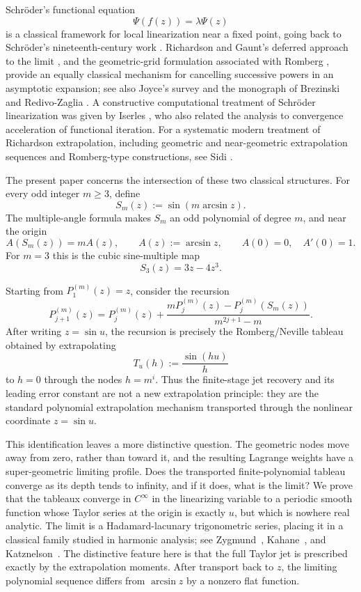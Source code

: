 \documentclass[11pt]{article}
\theoremstyle{remark}
\begin{document}
Schr\"oder's functional equation
\[
\Psi(f(z))=\lambda\Psi(z)
\]
is a classical framework for local linearization near a fixed point, going
back to Schr\"oder's nineteenth-century work \cite{Schroeder1870}.  Richardson
and Gaunt's deferred approach to the limit \cite{RichardsonGaunt1927}, and the
geometric-grid formulation associated with Romberg \cite{Romberg1955}, provide
an equally classical mechanism for cancelling successive powers in an
asymptotic expansion; see also Joyce's survey \cite{Joyce1971} and the monograph
of Brezinski and Redivo-Zaglia \cite{BrezinskiRedivo1991}.  A constructive
computational treatment of Schr\"oder linearization was given by Iserles
\cite{Iserles1993}, who also related the analysis to convergence acceleration of
functional iteration.  For a systematic modern treatment of Richardson
extrapolation, including geometric and near-geometric extrapolation sequences and
Romberg-type constructions, see Sidi \cite{Sidi2003}.

The present paper concerns the intersection of these two classical structures.
For every odd integer $m\ge3$, define
\begin{equation}
S_m(z):=\sin(m\arcsin z).
\label{eq:Sm}
\end{equation}
The multiple-angle formula makes $S_m$ an odd polynomial of degree $m$, and
near the origin
\begin{equation}
A(S_m(z))=mA(z),
\qquad A(z):=\arcsin z,
\qquad A(0)=0,\quad A'(0)=1.
\label{eq:schroeder}
\end{equation}
For $m=3$ this is the cubic sine-multiple map
\[
S_3(z)=3z-4z^3.
\]

Starting from $P^{(m)}_1(z)=z$, consider the recursion
\begin{equation}
P^{(m)}_{j+1}(z)
=
P^{(m)}_j(z)+
\frac{mP^{(m)}_j(z)-P^{(m)}_j(S_m(z))}
     {m^{2j+1}-m}.
\label{eq:lift}
\end{equation}
After writing $z=\sin u$, the recursion is precisely the Romberg/Neville
tableau obtained by extrapolating
\[
T_u(h):=\frac{\sin(hu)}{h}
\]
to $h=0$ through the nodes $h=m^i$.  Thus the finite-stage jet recovery and its
leading error constant are not a new extrapolation principle: they are the
standard polynomial extrapolation mechanism transported through the nonlinear
coordinate $z=\sin u$.

This identification leaves a more distinctive question.  The geometric nodes
move away from zero, rather than toward it, and the resulting Lagrange weights
have a super-geometric limiting profile.  Does the transported finite-polynomial
tableau converge as its depth tends to infinity, and if it does, what is the
limit?  We prove that the tableaux converge in $C^\infty$ in the linearizing
variable to a periodic smooth function whose Taylor series at the origin is
exactly $u$, but which is nowhere real analytic.  The limit is a
Hadamard-lacunary trigonometric series, placing it in a classical family studied
in harmonic analysis; see Zygmund~\cite{Zygmund2002}, Kahane~\cite{Kahane1964},
and Katznelson~\cite{Katznelson2004}.  The distinctive feature here is that the
full Taylor jet is prescribed exactly by the extrapolation moments.  After
transport back to $z$, the limiting polynomial sequence differs from $\arcsin z$
by a nonzero flat function.
\end{document}
